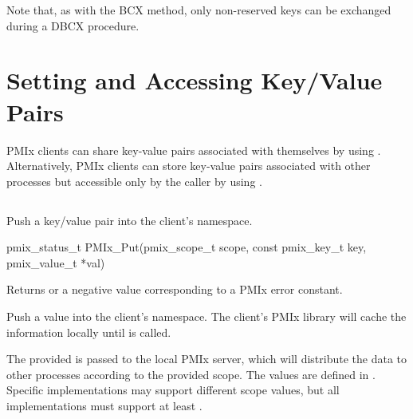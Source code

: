 Note that, as with the \ac{BCX} method, only non-reserved keys can be exchanged during a \ac{DBCX} procedure.


\section{Setting and Accessing Key/Value Pairs}
\label{chap:api_kv_mgmt:set}

\ac{PMIx} clients can share key-value pairs associated with themselves by using . Alternatively, \ac{PMIx} clients can store key-value pairs associated with other processes but accessible only by the caller by using .

\subsection{}

\summary

Push a key/value pair into the client's namespace.

\format

\cspecificstart
\begin{codepar}
pmix_status_t
PMIx_Put(pmix_scope_t scope,
         const pmix_key_t key,
         pmix_value_t *val)
\end{codepar}
\cspecificend

\begin{arglist}
\end{arglist}

Returns  or a negative value corresponding to a PMIx error constant.

\descr

Push a value into the client's namespace.
The client's \ac{PMIx} library will cache the information locally until  is called.

The provided  is passed to the local PMIx server, which will distribute the data to other processes according to the provided scope.
The  values are defined in .
Specific implementations may support different scope values, but all implementations must support at least .

